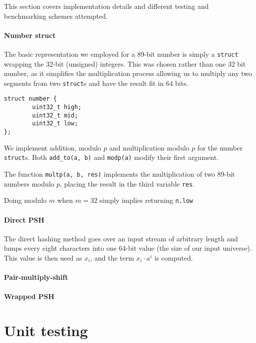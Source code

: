 \documentclass[]{article}
\newcommand{\funk}[1]{\small\texttt{#1}}
\begin{document}
This section covers implementation details and different testing and benchmarking schemes attempted.

\paragraph{Number struct}

The basic representation we employed for a 89-bit number is simply a \funk{struct} wrapping the 32-bit (unsigned) integers. This was chosen rather than one 32 bit number, as it simplifies the multiplication process allowing us to multiply any two segments from two \funk{struct}s and have the result fit in 64 bits.

\begin{verbatim}
struct number {
        uint32_t high;
        uint32_t mid;
        uint32_t low;
};
\end{verbatim}

We implement addition, modulo $p$ and multiplication modulo $p$ for the number \funk{struct}s. Both \funk{add\_to(a, b)} and \funk{modp(a)} modify their first argument.

The function \funk{multp(a, b, res)} implements the multiplication of two 89-bit numbers modulo $p$, placing the result in the third variable \funk{res}.

Doing modulo $m$ when $m = 32$ simply implies returning \funk{n.low}

\paragraph{Direct PSH}

The direct hashing method goes over an input stream of arbitrary length and lumps every eight characters into one 64-bit value (the size of our input universe). This value is then used as $x_i$, and the term $x_i\cdot a^i$ is computed.

\paragraph{Pair-multiply-shift}
\paragraph{Wrapped PSH}

\section{Unit testing}
\end{document}
